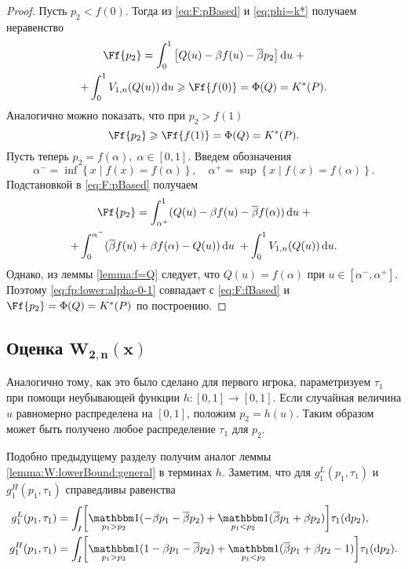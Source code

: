 {\begin{proof}
  Пусть $p_2 < f(0)$.
  Тогда из \eqref{eq:F:pBased} и \eqref{eq:phi=k*} получаем неравенство
  \begin{multline*}
    \Ff{p_2} = \int_0^1 \left[
      Q(u) - \Co f(u) - \DCo p_2
      \right] \di u \; + \\
    + \int_0^1 V_{1,n}(Q(u)) \di u \geqslant \Ff{f(0)} = \Phi(Q) = K^*(P).
  \end{multline*}
  Аналогично можно показать, что при $p_2 > f(1)$
  \begin{equation*}
    \Ff{p_2} \geqslant \Ff{f(1)} = \Phi(Q) = K^*(P).
  \end{equation*}
  Пусть теперь $p_2 = f(\alpha), \; \alpha \in [0, 1]$.
  Введем обозначения
  \[
    \alpha^- = \inf \left\{ x \;|\; f(x) = f(\alpha) \right\}, \quad
    \alpha^+ = \sup \left\{ x \;|\; f(x) = f(\alpha) \right\}.
  \]
  Подстановкой в \eqref{eq:F:pBased} получаем
  \begin{multline}\label{eq:fp:lower:alpha-0-1}
    \Ff{p_2} =
    \int_{\alpha^+}^1  (Q(u) - \Co f(u) - \DCo f(\alpha)) \di u \; + \\
    + \int_0^{\alpha^-} (\DCo f(u) + \Co f(\alpha) - Q(u)) \di u \; +
    \int_0^1 V_{1,n}(Q(u)) \di u.
  \end{multline}
  Однако, из леммы \ref{lemma:f=Q} следует, что $Q(u) = f(\alpha)$ при $u \in [\alpha^-, \alpha^+]$.
  Поэтому \eqref{eq:fp:lower:alpha-0-1} совпадает с \eqref{eq:F:fBased} и
  $\Ff{p_2} = \Phi(Q) = K^*(P)$
  по построению.
\end{proof}

\subsection{Оценка $\mathbf{W_{2,n}\left(x\right)}$}\label{sec:-dual-game-estimate}
Аналогично тому, как это было сделано для первого игрока, параметризуем $\tau_1$ при помощи неубывающей функции $h: [0, 1] \rightarrow [0, 1]$.
Если случайная величина $u$ равномерно распределена на $[0, 1]$, положим $p_2 = h(u)$.
Таким образом может быть получено любое распределение $\tau_1$ для $p_2$.

Подобно предыдущему разделу получим аналог леммы \ref{lemma:W:lowerBound:general} в терминах $h$.
Заметим, что для $g_1^L(p_1, \tau_1)$ и $g_1^H(p_1, \tau_1)$ справедливы равенства
\begin{align*}
    g_1^L(p_1,\tau_1) &=
    \int_I \biggl[
    \Ind_{p_1>p_2} (-\Co p_1 - \DCo p_2) +
    \Ind_{p_1<p_2} (\DCo p_1 + \Co p_2)
    \biggr] \tau_1(\di p_2),\\
    g_1^H(p_1,\tau_1) &=
    \int_I \biggl[
    \Ind_{p_1>p_2} (1 -\Co p_1 - \DCo p_2) +
    \Ind_{p_1<p_2} (\DCo p_1 + \Co p_2 - 1)
    \biggr] \tau_1(\di p_2).
\end{align*}

}
